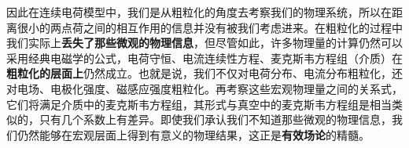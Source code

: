 因此在连续电荷模型中，我们是从粗粒化的角度去考察我们的物理系统，所以在距离很小的两点荷之间的相互作用的信息并没有被我们考虑进来。在粗粒化的过程中我们实际上\textbf{丢失了那些微观的物理信息}，但尽管如此，许多物理量的计算仍然可以采用经典电磁学的公式，电荷守恒、电流连续性方程、麦克斯韦方程组（介质）在\textbf{粗粒化的层面上}仍然成立。也就是说，我们不仅对电荷分布、电流分布粗粒化，还对电场、电极化强度、磁感应强度粗粒化。再考察这些宏观物理量之间的关系式，它们将满足介质中的麦克斯韦方程组，其形式与真空中的麦克斯韦方程组是相当类似的，只有几个系数上有差异。即使我们承认我们不知道那些微观的物理信息，我们仍然能够在宏观层面上得到有意义的物理结果，这正是\textbf{有效场论}的精髓。
